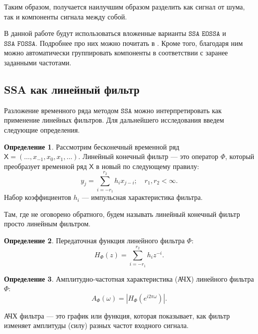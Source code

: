 \documentclass[12pt, specialist, subf
]{disser}
\theoremstyle{definition}
\newcommand{\SSA}{\texttt{SSA}}
\newcommand{\EOSSA}{\texttt{SSA EOSSA}}
\newcommand{\FOSSA}{\texttt{SSA FOSSA}}
\newcommand{\TS}{\mathsf{X}}
\newtheorem{definition}{Определение} %
\begin{document}
Таким образом, получается наилучшим образом разделить как сигнал от шума, так и компоненты сигнала между собой.

В данной работе будут использоваться вложенные варианты $\EOSSA$ и $\FOSSA$. Подробнее про них можно почитать в \cite{golyandina2023intelligent}. Кроме того, благодаря ним можно автоматически группировать компоненты в соответствии с заранее заданными частотами.



\subsection{SSA как линейный фильтр}
Разложение временного ряда методом $\SSA$ можно интерпретировать как применение линейных фильтров. Для дальнейшего исследования введем следующие определения.

\begin{definition}
	Рассмотрим бесконечный временной ряд $\TS = (\dots, x_{-1}, x_0, x_1, \dots)$. Линейный конечный фильтр --- это оператор $\Phi$, который преобразует временной ряд $\TS$ в новый по следующему правилу:
	\begin{equation*}
		y_j = \sum \limits_{i = -r_1}^{r_2} h_i x_{j-i}; \quad r_1, r_2 < \infty.
	\end{equation*}
	Набор коэффициентов ${h_i}$ --- импульсная характеристика фильтра.
\end{definition}

Там, где не оговорено обратного, будем называть линейный конечный фильтр просто линейным фильтром.

\begin{definition}
	Передаточная функция линейного фильтра $\Phi$:
	\begin{equation*}
		H_{\Phi}(z) = \sum \limits_{i = -r_1}^{r_2} h_i z^{-i}.
	\end{equation*}
\end{definition}

\begin{definition}
	Амплитудно-частотная характеристика (АЧХ) линейного фильтра $\Phi$:
	\begin{equation*}
		A_{\Phi}(\omega) = \left| H_{\Phi}\left(e^{i2\pi\omega}\right) \right|.
	\end{equation*}
\end{definition}

АЧХ фильтра  — это график или функция, которая показывает, как фильтр изменяет амплитуды (силу) разных частот входного сигнала.
\end{document}
